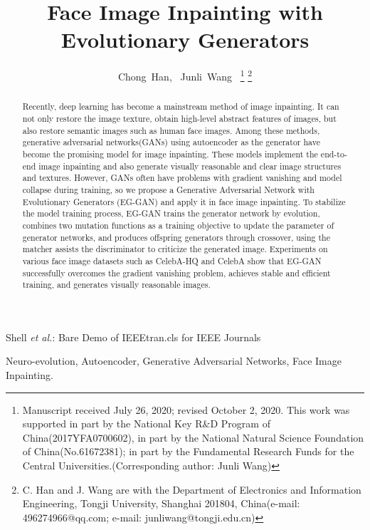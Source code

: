\documentclass[journal]{IEEEtran}
\begin{document}
\title{Face Image Inpainting with Evolutionary Generators}

\author{Chong~Han,~\IEEEmembership{}
        Junli~Wang~\IEEEmembership{}
\thanks{Manuscript received July 26, 2020; revised October 2, 2020. This work was supported in part by the National Key R\&D Program of China(2017YFA0700602), in part by the National Natural Science Foundation of China(No.61672381); in part by the Fundamental Research Funds for the Central Universities.(Corresponding author: Junli Wang)}
\thanks{C. Han and J. Wang are with the Department of Electronics and Information Engineering, Tongji University, Shanghai 201804, China(e-mail: 496274966@qq.com; e-mail: junliwang@tongji.edu.cn)}
}

{Shell \MakeLowercase{\textit{et al.}}: Bare Demo of IEEEtran.cls for IEEE Journals}
\maketitle

\begin{abstract}
Recently, deep learning has become a mainstream method of image inpainting. It can not only restore the image texture, obtain high-level abstract features of images, but also restore semantic images such as human face images. Among these methods, generative adversarial networks(GANs) using autoencoder as the generator have become the promising model for image inpainting. These models implement the end-to-end image inpainting and also generate visually reasonable and clear image structures and textures. However, GANs often have problems with gradient vanishing and model collapse during training, so we propose a Generative Adversarial Network with Evolutionary Generators (EG-GAN) and apply it in face image inpainting. To stabilize the model training process, EG-GAN trains the generator network by evolution, combines two mutation functions as a training objective to update the parameter of generator networks, and produces offspring generators through crossover, using the matcher assists the discriminator to criticize the generated image. Experiments on various face image datasets such as CelebA-HQ and CelebA show that EG-GAN successfully overcomes the gradient vanishing problem, achieves stable and efficient training, and generates visually reasonable images.
\end{abstract}

\begin{IEEEkeywords}
Neuro-evolution, Autoencoder, Generative Adversarial Networks, Face Image Inpainting.
\end{IEEEkeywords}
\end{document}
